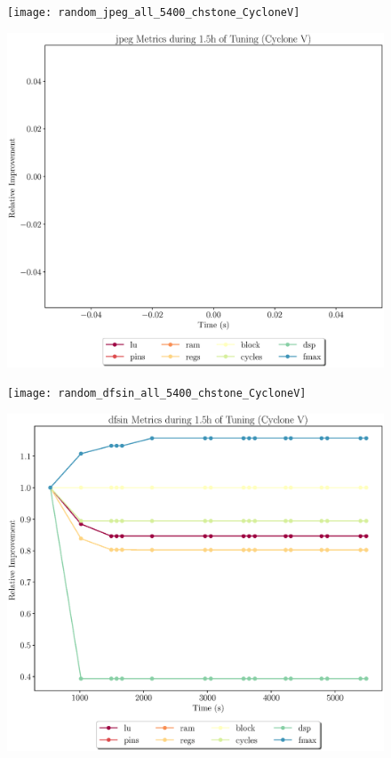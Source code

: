 \documentclass[12pt, a4paper]{article}
\begin{document}
\begin{figure}[htpb]
    \centering
    \begin{minipage}{.48\textwidth}
        \texttt{[image: random\_jpeg\_all\_5400\_chstone\_CycloneV]}
    \end{minipage}%
    \hfill
    \begin{minipage}{.48\textwidth}
        \includegraphics[scale=.25]{jpeg_all_5400_chstone_CycloneV}
    \end{minipage}%

    \begin{minipage}{.48\textwidth}
        \texttt{[image: random\_dfsin\_all\_5400\_chstone\_CycloneV]}
    \end{minipage}%
    \hfill
    \begin{minipage}{.48\textwidth}
        \includegraphics[scale=.25]{dfsin_all_5400_chstone_CycloneV}
    \end{minipage}%


\end{figure}
\end{document}
